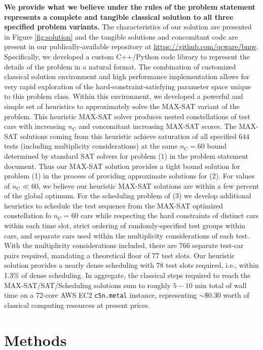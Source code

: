 \documentclass[aps,pra,twocolumn,superscriptaddress,groupedaddress]{revtex4}  %
\begin{document}
\textbf{We provide what we believe under the rules of the problem statement
represents a complete and tangible classical solution to all three specified
problem variants.} 
The characteristics of our solution are presented in Figure \ref{fig:solution}
and the tangible solutions and concomitant code are present in our
publically-available repository at
\href{https://github.com/qcware/bmw}{https://github.com/qcware/bmw}.
Specifically, we developed a custom C++/Python code library to represent the
details of the problem in a natural format. 
The combination of customized classical solution environment and high
performance implementation allows for very rapid exploration of the
hard-constraint-satisfying parameter space unique to this problem class.  Within
this environment, we developed a powerful and simple set of heuristics to
approximately solve the MAX-SAT variant of the problem. This heuristic MAX-SAT
solver produces nested constellations of test cars with increasing
$n_{\mathrm{C}}$ and concomitant increasing MAX-SAT scores. The MAX-SAT
solutions coming from this heuristic achieve saturation of all specified $644$
tests (including multiplicity considerations) at the same $n_{\mathrm{C}} = 60$
bound determined by standard SAT solvers for problem (1) in the problem
statement document. Thus our MAX-SAT solution provides a tight bound solution
for problem (1) in the process of providing approximate solutions for (2). For
values of $n_{\mathrm{C}} \ll 60$, we believe our heuristic MAX-SAT solutions
are within a few percent of the global optimum. For the scheduling problem of
(3) we develop additional heuristics to schedule the test sequence from the
MAX-SAT optimized constellation fo $n_{\mathrm{C}} = 60$ cars while respecting
the hard constraints of distinct cars within each time slot, strict ordering of
randomly-specified test groups within cars, and separate cars used within the
multiplicity considerations of each test. With the multiplicity considerations
included, there are 766 separate test-car pairs required, mandating a
theoretical floor of 77 test slots. Our heuristic solution provides a nearly
dense scheduling with 78 test slots required, i.e., within 1.3$\%$ of dense
scheduling. In aggregate, the classical steps required to reach the
MAX-SAT/SAT/Scheduling solutions sum to roughly $5-10$ min total of wall time on
a 72-core AWS EC2 \texttt{c5n.metal} instance, representing $\sim \$0.30$ worth
of classical computing resources at present prices.

\section{Methods}
\end{document}
